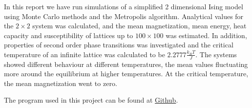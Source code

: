 

In this report we have run simulations of a simplified 2 dimensional Ising model  using Monte Carlo methods and the Metropolis algorithm.  Analytical values for the $ 2\times 2 $ system was calculated, and the mean magnetization, mean energy, heat capacity and susceptibility of lattices up to $ 100 \times 100 $ was estimated. In addition, properties of second order phase transitions was investigated and the critical temperature of an infinite lattice was calculated to be $  2.2777  \frac{k_BT}{J}   $. The systems showed different behaviour at different temperatures, the mean values fluctuating more around the equilibrium at higher temperatures. At the critical temperature, the mean magnetization went to zero. 


The program used in this project can be found at \href{https://github.com/kjetka/Project4}{Github}. 
